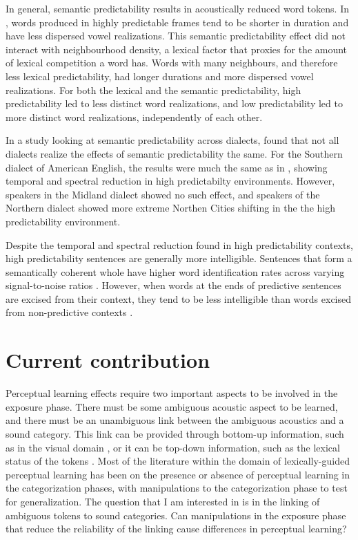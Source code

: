 In general, semantic predictability results in acoustically reduced word tokens.  
In \citet{Scarborough2010}, words produced in highly predictable frames tend to be shorter in duration and have less dispersed vowel realizations.  
This semantic predictability effect did not interact with neighbourhood density, a lexical factor that proxies for the amount of lexical competition a word has.  
Words with many neighbours, and therefore less lexical predictability, had longer durations and more dispersed vowel realizations.  
For both the lexical and the semantic predictability, high predictability led to less distinct word realizations, and low predictability led to more distinct word realizations, independently of each other.

In a study looking at semantic predictability across dialects, \citet{Clopper2008} found that not all dialects realize the effects of semantic predictability the same.  
For the Southern dialect of American English, the results were much the same as in \citet{Scarborough2010}, showing temporal and spectral reduction in high predictabilty environments.  
However, speakers in the Midland dialect showed no such effect, and speakers of the Northern dialect showed more extreme Northen Cities shifting in the the high predictability environment.

Despite the temporal and spectral reduction found in high predictability contexts, high predictability sentences are generally more intelligible.  
Sentences that form a semantically coherent whole have higher word identification rates across varying signal-to-noise ratios \citep{Kalikow1977}.  
However, when words at the ends of predictive sentences are excised from their context, they tend to be less intelligible than words excised from non-predictive contexts \citep{Lieberman1963}.

\section{Current contribution}

Perceptual learning effects require two important aspects to be involved in the exposure phase.  
There must be some ambiguous acoustic aspect to be learned, and there must be an unambiguous link between the ambiguous acoustics and a sound category. 
This link can be provided through bottom-up information, such as in the visual domain \citep{Bertelson2003}, or it can be top-down information, such as the lexical status of the tokens \citep{Norris2003}. 
Most of the literature within the domain of lexically-guided perceptual learning has been on the presence or absence of perceptual learning in the categorization phases, with manipulations to the categorization phase to test for generalization.  
The question that I am interested in is in the linking of ambiguous tokens to sound categories.  
Can manipulations in the exposure phase that reduce the reliability of the linking cause differences in perceptual learning?

